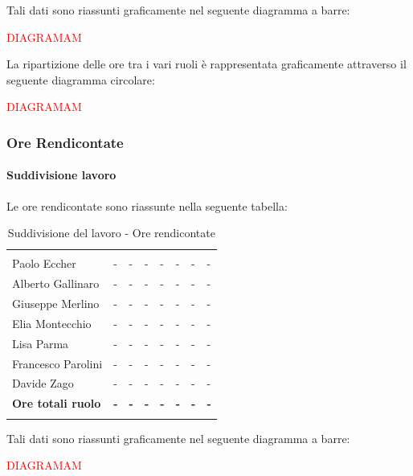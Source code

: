 			Tali dati sono riassunti graficamente nel seguente diagramma a barre:
			
			\textcolor{red}{DIAGRAMAM}
			
			La ripartizione delle ore tra i vari ruoli è rappresentata graficamente 
			attraverso il seguente diagramma circolare:
			
			\textcolor{red}{DIAGRAMAM}
			
			\subsubsection{Ore Rendicontate}
			
			\paragraph{Suddivisione lavoro} \Spazio
			Le ore rendicontate sono riassunte nella seguente tabella:
			\begin{table}[H]
				\centering
				\begin{tabular}{C{4cm}|C{0.6cm}|C{0.6cm}|C{0.6cm}|C{0.6cm}|C{0.6cm}|C{0.6cm}|C{3cm}}
					 & & &&&&&\\
					Paolo Eccher & - & - & - & - & - & - & - \\
					Alberto Gallinaro & - & - & - & - & - & - & - \\
					Giuseppe Merlino & - & - & - & - & - & - & - \\
					Elia Montecchio & - & - & - & - & - & - & - \\
					Lisa Parma & - & - & - & - & - & - & - \\
					Francesco Parolini & - & - & - & - & - & - & - \\
					Davide Zago & - & - & - & - & - & - & - \\
					\textbf{Ore totali ruolo}  & \textbf{-} & \textbf{-} & \textbf{-} & \textbf{-} & \textbf{-} & \textbf{-} & \textbf{-} \\
				\end{tabular}
				\caption{Suddivisione del lavoro - Ore rendicontate }
			\end{table}
			
			Tali dati sono riassunti graficamente nel seguente diagramma a barre:
			
			\textcolor{red}{DIAGRAMAM}
			
